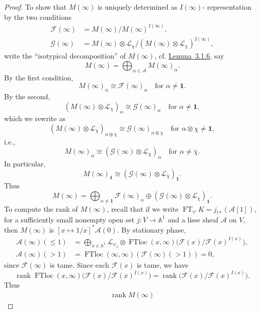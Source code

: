 \begin{proof}
To show that \(M(\infty)\) is uniquely determined as \(I(\infty)\)-
representation by the two conditions
\[
\begin{aligned}
  \mathcal{F}(\infty)&=M(\infty)/M(\infty)^{I(\infty)},\\
  \mathcal{G}(\infty)&=
  M(\infty)\otimes\mathcal{L}_{\chi}/
  (M(\infty)\otimes\mathcal{L}_{\chi})^{I(\infty)},
\end{aligned}
\]
write the ``isotypical decomposition'' of \(M(\infty)\), cf.
\hyperref[lem:3.1.6]{Lemma~3.1.6}, say
\[
  M(\infty)=\bigoplus_{\alpha\in\mathcal{A}}M(\infty)_\alpha.
\]
By the first condition,
\[
  M(\infty)_\alpha\cong\mathcal{F}(\infty)_\alpha
  \quad\text{for }\alpha\ne\mathbf{1}.
\]
By the second,
\[
  (M(\infty)\otimes\mathcal{L}_{\chi})_\alpha
  \cong
  \mathcal{G}(\infty)_\alpha\quad\text{for }\alpha\ne\mathbf{1},
\]
which we rewrite as
\[
  (M(\infty)\otimes\mathcal{L}_{\chi})_{\alpha\otimes\chi}
  \cong
  \mathcal{G}(\infty)_{\alpha\otimes\chi}
  \quad\text{for }\alpha\otimes\chi\ne\mathbf{1},
\]
i.e.,
\[
  M(\infty)_\alpha
  \cong
  (\mathcal{G}(\infty)\otimes\mathcal{L}_{\overline{\chi}})_\alpha
  \quad\text{for }\alpha\ne\overline{\chi}.
\]
In particular,
\[
  M(\infty)_{\mathbf{1}}
  \cong
  (\mathcal{G}(\infty)\otimes\mathcal{L}_{\overline{\chi}})_{\mathbf{1}}.
\]
Thus
\[
  M(\infty)
  =
  \bigoplus_{\alpha\ne\mathbf{1}}\mathcal{F}(\infty)_\alpha
  \oplus
  (\mathcal{G}(\infty)\otimes\mathcal{L}_{\overline{\chi}})_{\mathbf{1}}.
\]
To compute the rank of \(M(\infty)\), recall that if we write
\(\operatorname{FT}_{\psi}K=j_{!*}(\mathcal{A}[1])\), for a sufficiently small
nonempty open set \(j:V\to\mathbb{A}^1\) and a lisse sheaf \(\mathcal{A}\) on
\(V\), then \(M(\infty)\) is \([x\mapsto 1/x]^*\mathcal{A}(0)\). By stationary
phase,
\[
\begin{aligned}
  \mathcal{A}(\infty)(\leq1)
  &=
  \bigoplus_{x\in\mathbb{A}^1}
  \mathcal{L}_{\psi_x}\otimes
  \operatorname{FTloc}(x,\infty)
  \bigl(\mathcal{F}(x)/\mathcal{F}(x)^{I(x)}\bigr),\\
  \mathcal{A}(\infty)(>1)
  &=
  \operatorname{FTloc}(\infty,\infty)(\mathcal{F}(\infty)(>1))
  =
  0,
\end{aligned}
\]
since \(\mathcal{F}(\infty)\) is tame. Since each \(\mathcal{F}(x)\) is tame,
we have
\[
  \operatorname{rank}
  \operatorname{FTloc}(x,\infty)
  \bigl(\mathcal{F}(x)/\mathcal{F}(x)^{I(x)}\bigr)
  =
  \operatorname{rank}\bigl(\mathcal{F}(x)/\mathcal{F}(x)^{I(x)}\bigr).
\]
Thus
\[
\begin{aligned}
  \operatorname{rank}M(\infty)

\end{aligned}\]
\end{proof}
